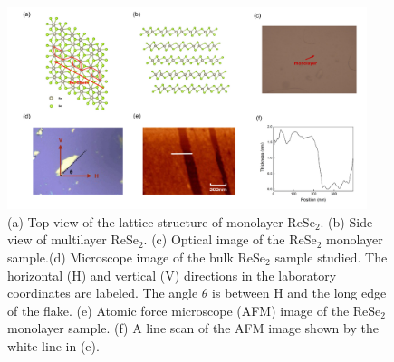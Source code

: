 \documentclass{osa-article}
\begin{document}
\begin{figure}
  \centering
  \includegraphics[width=10.5cm]{sample.pdf}
  \caption{(a) Top view of the lattice structure of monolayer ReSe$_2$. (b) Side view of multilayer ReSe$_2$. (c) Optical image of the ReSe$_2$ monolayer sample.(d) Microscope image of the bulk ReSe$_2$ sample studied. The horizontal (H) and vertical (V) directions in the laboratory coordinates are labeled. The angle $\theta$ is between H and the long edge of the flake. (e) Atomic force microscope (AFM) image of the ReSe$_2$ monolayer sample. (f) A line scan of the AFM image shown by the white line in (e).}
    \label{fig:sample}
\end{figure}
\end{document}

